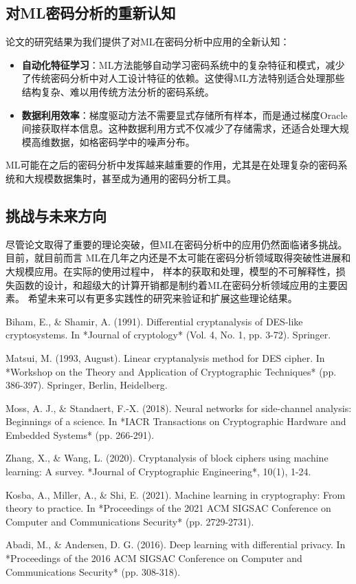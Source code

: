 \documentclass{article}
\begin{document}
\subsection{对ML密码分析的重新认知}
论文的研究结果为我们提供了对ML在密码分析中应用的全新认知：

\begin{itemize}[leftmargin=*]
    \item \textbf{自动化特征学习}：ML方法能够自动学习密码系统中的复杂特征和模式，减少了传统密码分析中对人工设计特征的依赖。这使得ML方法特别适合处理那些结构复杂、难以用传统方法分析的密码系统。
    \item \textbf{数据利用效率}：梯度驱动方法不需要显式存储所有样本，而是通过梯度Oracle间接获取样本信息。这种数据利用方式不仅减少了存储需求，还适合处理大规模高维数据，如格密码学中的噪声分布。
\end{itemize}
ML可能在之后的密码分析中发挥越来越重要的作用，尤其是在处理复杂的密码系统和大规模数据集时，甚至成为通用的密码分析工具。

\subsection{挑战与未来方向}
尽管论文取得了重要的理论突破，但ML在密码分析中的应用仍然面临诸多挑战。目前，就目前而言
ML在几年之内还是不太可能在密码分析领域取得突破性进展和大规模应用。在实际的使用过程中，
样本的获取和处理，模型的不可解释性，损失函数的设计，和超级大的计算开销都是制约着ML在密码分析领域应用的主要因素。
希望未来可以有更多实践性的研究来验证和扩展这些理论结果。





\begin{thebibliography}{99}
Biham, E., \& Shamir, A. (1991). Differential cryptanalysis of DES-like cryptosystems. In *Journal of cryptology* (Vol. 4, No. 1, pp. 3-72). Springer.

Matsui, M. (1993, August). Linear cryptanalysis method for DES cipher. In *Workshop on the Theory and Application of Cryptographic Techniques* (pp. 386-397). Springer, Berlin, Heidelberg.

Moss, A. J., \& Standaert, F.-X. (2018). Neural networks for side-channel analysis: Beginnings of a science. In *IACR Transactions on Cryptographic Hardware and Embedded Systems* (pp. 266-291).

Zhang, X., \& Wang, L. (2020). Cryptanalysis of block ciphers using machine learning: A survey. *Journal of Cryptographic Engineering*, 10(1), 1-24.

Kosba, A., Miller, A., \& Shi, E. (2021). Machine learning in cryptography: From theory to practice. In *Proceedings of the 2021 ACM SIGSAC Conference on Computer and Communications Security* (pp. 2729-2731).

Abadi, M., \& Andersen, D. G. (2016). Deep learning with differential privacy. In *Proceedings of the 2016 ACM SIGSAC Conference on Computer and Communications Security* (pp. 308-318).
\end{thebibliography}
\end{document}
